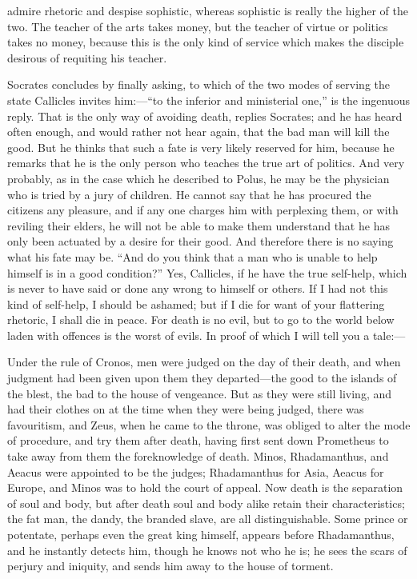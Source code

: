 \documentclass[11pt,letter]{article}
\begin{document}
admire rhetoric and despise sophistic, whereas sophistic is really the higher of the two. The teacher of the arts takes money, but the teacher of virtue or politics takes no money, because this is the only kind of service which makes the disciple desirous of requiting his teacher.

\par  Socrates concludes by finally asking, to which of the two modes of serving the state Callicles invites him:—“to the inferior and ministerial one,” is the ingenuous reply. That is the only way of avoiding death, replies Socrates; and he has heard often enough, and would rather not hear again, that the bad man will kill the good. But he thinks that such a fate is very likely reserved for him, because he remarks that he is the only person who teaches the true art of politics. And very probably, as in the case which he described to Polus, he may be the physician who is tried by a jury of children. He cannot say that he has procured the citizens any pleasure, and if any one charges him with perplexing them, or with reviling their elders, he will not be able to make them understand that he has only been actuated by a desire for their good. And therefore there is no saying what his fate may be. “And do you think that a man who is unable to help himself is in a good condition?” Yes, Callicles, if he have the true self-help, which is never to have said or done any wrong to himself or others. If I had not this kind of self-help, I should be ashamed; but if I die for want of your flattering rhetoric, I shall die in peace. For death is no evil, but to go to the world below laden with offences is the worst of evils. In proof of which I will tell you a tale:—

\par  Under the rule of Cronos, men were judged on the day of their death, and when judgment had been given upon them they departed—the good to the islands of the blest, the bad to the house of vengeance. But as they were still living, and had their clothes on at the time when they were being judged, there was favouritism, and Zeus, when he came to the throne, was obliged to alter the mode of procedure, and try them after death, having first sent down Prometheus to take away from them the foreknowledge of death. Minos, Rhadamanthus, and Aeacus were appointed to be the judges; Rhadamanthus for Asia, Aeacus for Europe, and Minos was to hold the court of appeal. Now death is the separation of soul and body, but after death soul and body alike retain their characteristics; the fat man, the dandy, the branded slave, are all distinguishable. Some prince or potentate, perhaps even the great king himself, appears before Rhadamanthus, and he instantly detects him, though he knows not who he is; he sees the scars of perjury and iniquity, and sends him away to the house of torment.
\end{document}
